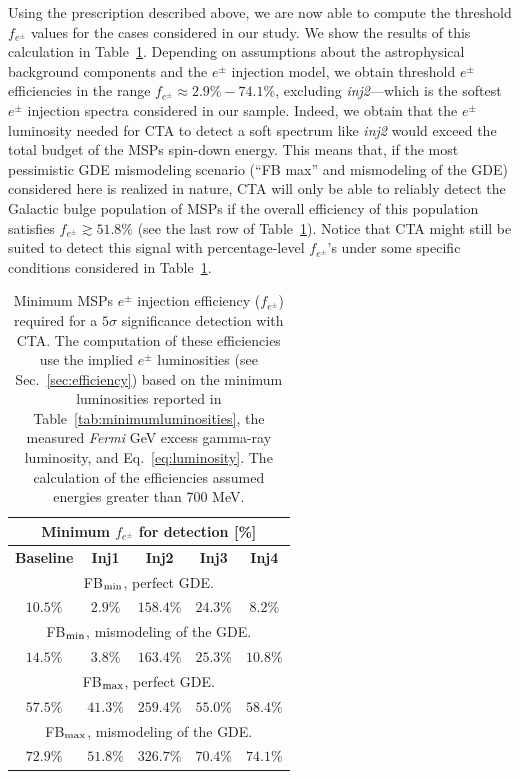 \documentclass[doublespace,nopageskip]{VTthesis}
\begin{document}
Using the prescription described above, we are now able to compute the threshold $f_{e^\pm}$ values for the cases considered in our study. We show the results of this calculation in Table~\ref{tab:minimumfe}. Depending on assumptions about the astrophysical background components and the $e^\pm$ injection model, we obtain threshold $e^\pm$ efficiencies in the range $f_{e^\pm}\approx 2.9\%-74.1\%$, excluding \textit{inj2}---which is the softest $e^\pm$ injection spectra considered in our sample. Indeed, we obtain that the $e^\pm$ luminosity needed for CTA to detect a soft spectrum like \textit{inj2} would exceed the total budget of the MSPs spin-down energy. This means that, if the most pessimistic GDE mismodeling scenario (``FB max'' and mismodeling of the GDE) considered here is realized in nature,
CTA will only be able to reliably detect the Galactic bulge population of MSPs if the overall efficiency of this population satisfies $f_{e^\pm}\gtrsim 51.8\%$ (see the last row of Table~\ref{tab:minimumfe}). Notice that CTA might still be suited to detect this signal with percentage-level $f_{e^\pm}$'s under some specific conditions considered in Table~\ref{tab:minimumfe}.

\begin{table}[htb]
  \begin{center}
    \caption{Minimum MSPs $e^{\pm}$ injection efficiency ($f_{e^\pm}$) required for a $5\sigma$ significance detection with CTA. The computation of these efficiencies use the implied $e^\pm$ luminosities (see Sec.~\ref{sec:efficiency}) based on the minimum luminosities reported in Table~\ref{tab:minimumluminosities}, the measured \textit{Fermi} GeV excess gamma-ray luminosity, and Eq.~\ref{eq:luminosity}. The calculation of the efficiencies assumed energies greater than 700 MeV.}
    \begin{tabular}{c|c|c|c|c}
    \toprule
     \multicolumn{5}{c}{ Minimum $f_{e^\pm}$ for detection [\%]}   \tabularnewline 
     \midrule
     \textbf{Baseline} & \textbf{Inj1} & \textbf{Inj2} & \textbf{Inj3} & \textbf{Inj4}\tabularnewline 
     \midrule
     \multicolumn{5}{c}{ 
     FB$_{\rm min}$, perfect GDE.}   \tabularnewline 
     \midrule
     $10.5\%$ & $2.9\%$ & $158.4\%$ & $24.3\%$ & $8.2\%$\tabularnewline 
     \midrule
     \multicolumn{5}{c}{ 
     FB$_{\rm min}$, mismodeling of the GDE.}\tabularnewline 
     \midrule
     $14.5\%$ & $3.8\%$ & $163.4\%$ & $25.3\%$ & $10.8\%$\tabularnewline 
     \midrule
     \multicolumn{5}{c}{ FB$_{\rm max}$, perfect GDE.}\tabularnewline 
     \midrule
     $57.5\%$ & $41.3\%$ & $259.4\%$ & $55.0\%$ & $58.4\%$\tabularnewline 
     \midrule
     \multicolumn{5}{c}{FB$_{\rm max}$, mismodeling of the GDE.}\tabularnewline 
     \midrule
     $72.9\%$ & $51.8\%$ & $326.7\%$ & $70.4\%$ & $74.1\%$\tabularnewline 
     \bottomrule
    \end{tabular}
    \label{tab:minimumfe}
  \end{center}
\end{table}
\end{document}
